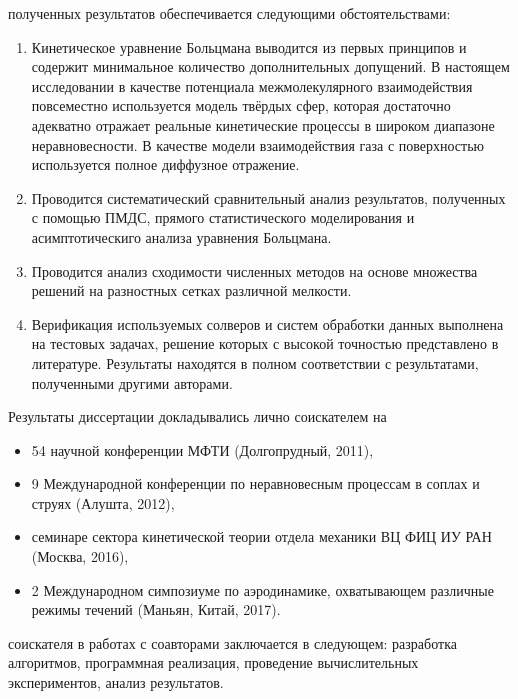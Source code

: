 {\reliability} полученных результатов обеспечивается следующими обстоятельствами:
\begin{enumerate}
    \item Кинетическое уравнение Больцмана выводится из первых принципов и
    содержит минимальное количество дополнительных допущений.
    В настоящем исследовании в качестве потенциала межмолекулярного взаимодействия
    повсеместно используется модель твёрдых сфер,
    которая достаточно адекватно отражает реальные кинетические процессы в широком диапазоне неравновесности.
    В качестве модели взаимодействия газа с поверхностью используется полное диффузное отражение.
    \item Проводится систематический сравнительный анализ результатов,
    полученных с помощью ПМДС, прямого статистического моделирования
    и асимптотическиго анализа уравнения Больцмана.
    \item Проводится анализ сходимости численных методов на основе
    множества решений на разностных сетках различной мелкости.
    \item Верификация используемых солверов и систем обработки данных
    выполнена на тестовых задачах, решение которых с высокой точностью представлено в литературе.
    Результаты находятся в полном соответствии с результатами, полученными другими авторами.
\end{enumerate}

{\probation} Результаты диссертации докладывались лично соискателем на
\begin{itemize}
    \item 54 научной конференции МФТИ (Долгопрудный, 2011),
    \item 9 Международной конференции по неравновесным процессам в соплах и струях (Алушта, 2012),
    \item семинаре сектора кинетической теории отдела механики ВЦ ФИЦ ИУ РАН (Москва, 2016),
    \item 2 Международном симпозиуме по аэродинамике, охватывающем различные режимы течений (Маньян, Китай, 2017).
\end{itemize}

{\contribution} соискателя в работах с соавторами заключается в следующем:
разработка алгоритмов, программная реализация, проведение вычислительных экспериментов, анализ результатов.

